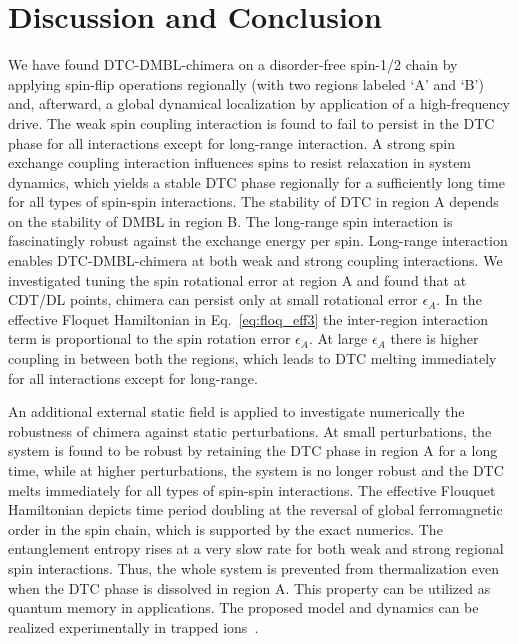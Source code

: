 \documentclass[%
reprint,
superscriptaddress,
amsmath,amssymb,showkeys,
aps,
prb,
]{revtex4-2}
\begin{document}
	
	\section{\label{sec:level7} Discussion and Conclusion}
	
	We have found DTC-DMBL-chimera on a  disorder-free spin-1/2 chain by applying spin-flip operations regionally (with two regions labeled `A' and `B') and, afterward, a global dynamical localization by application of  a high-frequency drive. The weak spin coupling interaction is found to fail to persist in the DTC phase for all interactions except for long-range interaction. A strong spin exchange coupling interaction influences spins to resist relaxation in system dynamics, which yields a stable DTC phase regionally for a sufficiently long time for all types of spin-spin interactions. The stability of DTC in region A depends on the stability of DMBL in region B. The long-range spin interaction is fascinatingly robust against the exchange energy per spin. Long-range interaction enables DTC-DMBL-chimera at both weak and strong coupling interactions. We investigated tuning the spin rotational error at region A and found that at CDT/DL points, chimera can persist only at small rotational error $\epsilon_A$. In the effective Floquet Hamiltonian in Eq.~\ref{eq:floq_eff3} the inter-region interaction term is proportional to the spin rotation error $\epsilon_A$. At large $\epsilon_A$ there is higher coupling in between both the regions, which leads to DTC melting immediately for all interactions except for long-range. 
	
	An additional external static field is applied to investigate numerically the robustness of chimera against static perturbations. At small perturbations, the system is found to be robust by retaining the DTC phase in region A for a long time, while at higher perturbations, the system is no longer robust and the DTC melts immediately for all types of spin-spin interactions. The effective Flouquet Hamiltonian depicts time period doubling at the reversal of global ferromagnetic order in the spin chain, which is supported by the exact numerics. The entanglement entropy rises at a very slow rate for both weak and strong regional spin interactions. Thus, the whole system is prevented from thermalization even when the DTC phase is dissolved in region A. This property can be utilized as quantum memory in applications. The proposed model and dynamics can be realized experimentally in trapped ions~\cite{sakurai_phys_nodate, Friedenauer2008}.
	
\end{document}
